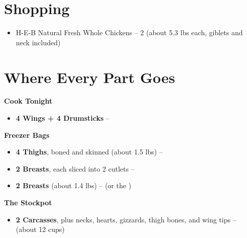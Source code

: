 




\section*{Shopping}

\begin{itemize}
      \item H-E-B Natural Fresh Whole Chickens – 2 (about 5.3 lbs each, giblets and neck included)
\end{itemize}

\section*{Where Every Part Goes}

\textbf{Cook Tonight}
\begin{itemize}[itemsep=0.1em, label={\raisebox{-0.1ex}{\large\textbullet}}]
      \item \textbf{4 Wings + 4 Drumsticks} – 
\end{itemize}

\textbf{Freezer Bags}
\begin{itemize}[itemsep=0.1em, label={\raisebox{-0.1ex}{\large\textbullet}}]
      \item \textbf{4 Thighs}, boned and skinned (about 1.5 lbs) – 
      \item \textbf{2 Breasts}, each sliced into 2 cutlets – 
      \item \textbf{2 Breasts} (about 1.4 lbs) –  (or the )
\end{itemize}

\textbf{The Stockpot}
\begin{itemize}[itemsep=0.1em, label={\raisebox{-0.1ex}{\large\textbullet}}]
      \item \textbf{2 Carcasses}, plus necks, hearts, gizzards, thigh bones, and wing tips –  (about 12 cups)
\end{itemize}

